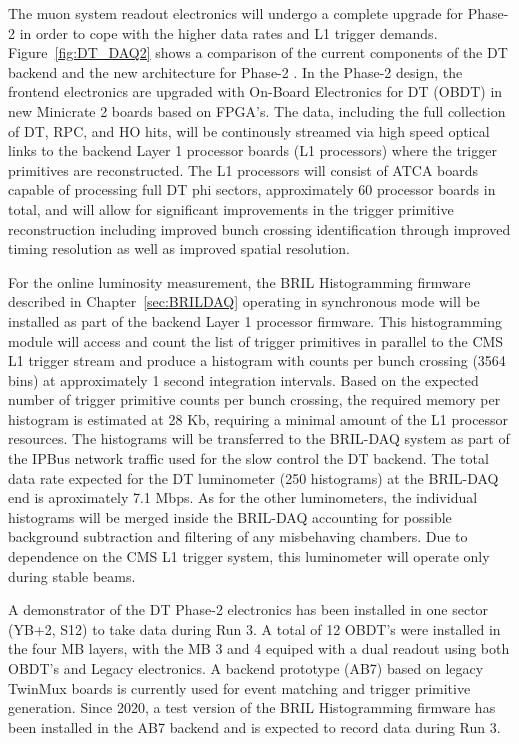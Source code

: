 The muon system readout electronics will undergo a complete upgrade for Phase-2 in order to cope with the higher data rates and L1 trigger demands.
Figure~\ref{fig:DT_DAQ2} shows a comparison of the current components of the DT backend and the new architecture for Phase-2 \cite{CERN-LHCC-2017-012}.
In the Phase-2 design, the frontend electronics are upgraded with On-Board Electronics for DT (OBDT) in new Minicrate 2 boards based on FPGA's.
The data, including the full collection of DT, RPC, and HO hits, will be continously streamed via high speed optical
links to the backend Layer 1 processor boards (L1 processors) where the trigger primitives are reconstructed.
The L1 processors will consist of ATCA boards capable of processing full DT phi sectors, approximately 60 processor boards in total,
and will allow for significant improvements in the trigger primitive reconstruction including improved bunch crossing identification
through improved timing resolution as well as improved spatial resolution. 


For the online luminosity measurement, the BRIL Histogramming firmware described in Chapter~\ref{sec:BRILDAQ}
operating in synchronous mode will be installed as part of the backend Layer 1 processor firmware.
This histogramming module will access and count the list of trigger primitives in parallel to the CMS L1 trigger stream
and produce a histogram with counts per bunch crossing (3564 bins) at approximately 1 second integration intervals.
Based on the expected number of trigger primitive counts per bunch crossing, the required memory per histogram is estimated at 28 Kb,
requiring a minimal amount of the L1 processor resources. 
The histograms  will be transferred to the BRIL-DAQ system as part of the IPBus network traffic used for the slow control the DT backend.
The total data rate expected for the DT luminometer (250 histograms) at the BRIL-DAQ end is aproximately 7.1 Mbps.
As for the other luminometers, the individual histograms will be merged inside the BRIL-DAQ accounting for possible background subtraction and filtering of any misbehaving chambers.
Due to dependence on the CMS L1 trigger system, this luminometer will operate only during stable beams.

A demonstrator of the DT Phase-2 electronics has been installed in one sector (YB+2, S12) to take data during Run 3.
A total of 12 OBDT's were installed in the four MB layers, with the MB 3 and 4 equiped with a dual readout using both OBDT's and Legacy electronics.
A backend prototype (AB7) based on legacy TwinMux boards is currently used for event matching and trigger primitive generation.
Since 2020, a test version of the BRIL Histogramming firmware has been installed in the AB7 backend and is expected to record data during Run 3.


